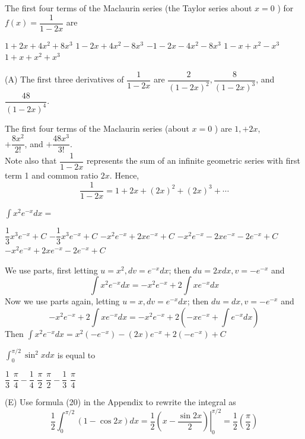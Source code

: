 \question
The first four terms of the Maclaurin series (the Taylor series about $x=0$ ) for $f(x)=\dfrac{1}{1-2 x}$ are
\begin{choices}
  \CorrectChoice $1+2 x+4 x^{2}+8 x^{3}$
  \choice $1-2 x+4 x^{2}-8 x^{3}$
  \choice $-1-2 x-4 x^{2}-8 x^{3}$
  \choice $1-x+x^{2}-x^{3}$
  \choice $1+x+x^{2}+x^{3}$
\end{choices}
\begin{solution}
(A) The first three derivatives of $\dfrac{1}{1-2 x}$ are $\dfrac{2}{(1-2 x)^{2}}, \dfrac{8}{(1-2 x)^{3}}$, and $\dfrac{48}{(1-2 x)^{4}}$.

The first four terms of the Maclaurin series (about $x=0$ ) are $1,+2 x$,\\
$+\dfrac{8 x^{2}}{2!}$, and $+\dfrac{48 x^{3}}{3!}$.\\
Note also that $\dfrac{1}{1-2 x}$ represents the sum of an infinite geometric series with first term 1 and common ratio $2 x$. Hence,
\[
\dfrac{1}{1-2 x}=1+2 x+(2 x)^{2}+(2 x)^{3}+\cdots
\]
\end{solution}


\newpage





\question
$\int x^{2} e^{-x} d x=$
\begin{choices}
  \choice $\dfrac{1}{3} x^{3} e^{-x}+C$
  \choice $-\dfrac{1}{3} x^{3} e^{-x}+C$
  \choice $-x^{2} e^{-x}+2 x e^{-x}+C$
  \CorrectChoice $-x^{2} e^{-x}-2 x e^{-x}-2 e^{-x}+C$
  \choice $-x^{2} e^{-x}+2 x e^{-x}-2 e^{-x}+C$


\end{choices}
\begin{solution}
We use parts, first letting $u=x^{2}, d v=e^{-x} d x$; then $d u=2 x d x, v=-e^{-x}$ and
\[
\int x^{2} e^{-x} d x=-x^{2} e^{-x}+2 \int x e^{-x} d x
\]
Now we use parts again, letting $u=x, d v=e^{-x} d x$; then $d u=d x, v=-e^{-x}$ and
\[
-x^{2} e^{-x}+2 \int x e^{-x} d x=-x^{2} e^{-x}+2\left(-x e^{-x}+\int e^{-x} d x\right)
\]
Then $\int x^{2} e^{-x} d x=x^{2}\left(-e^{-x}\right)-(2 x) e^{-x}+2\left(-e^{-x}\right)+C$
\end{solution}

\question
$\displaystyle\int_{0}^{\pi / 2} \sin ^{2} x d x$ is equal to
\begin{choices}
  \choice $\dfrac{1}{3}$
  \choice $\dfrac{\pi}{4}-\dfrac{1}{4}$
  \choice $\dfrac{\pi}{2}$
  \choice $\dfrac{\pi}{2}-\dfrac{1}{3}$
  \CorrectChoice $\dfrac{\pi}{4}$
\end{choices}
\begin{solution}
(E) Use formula (20) in the Appendix to rewrite the integral as
\[
\dfrac{1}{2} \displaystyle\int_{0}^{\pi / 2}(1-\cos 2 x) d x=\left.\dfrac{1}{2}\left(x-\dfrac{\sin 2 x}{2}\right)\right|_{0} ^{\pi / 2}=\dfrac{1}{2}\left(\dfrac{\pi}{2}\right)
\]
\end{solution}





